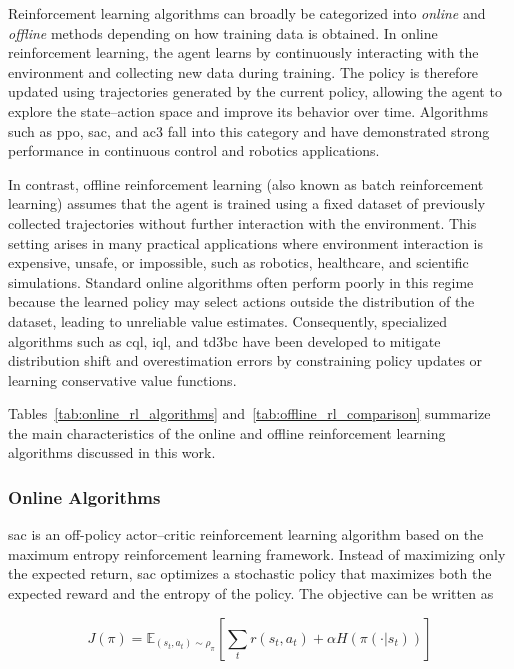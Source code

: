 
Reinforcement learning algorithms can broadly be categorized into \textit{online} and \textit{offline} methods depending on how training data is obtained.
In online reinforcement learning, the agent learns by continuously interacting with the environment and collecting new data during training.
The policy is therefore updated using trajectories generated by the current policy, allowing the agent to explore the state–action space and improve its behavior over time.
Algorithms such as \gls{ppo}, \gls{sac}, and \gls{ac3} fall into this category and have demonstrated strong performance in continuous control and robotics applications.

In contrast, offline reinforcement learning (also known as batch reinforcement learning) assumes that the agent is trained using a fixed dataset of previously collected trajectories without further interaction with the environment.
This setting arises in many practical applications where environment interaction is expensive, unsafe, or impossible, such as robotics, healthcare, and scientific simulations.
Standard online algorithms often perform poorly in this regime because the learned policy may select actions outside the distribution of the dataset, leading to unreliable value estimates.
Consequently, specialized algorithms such as \gls{cql}, \gls{iql}, and \gls{td3bc} have been developed to mitigate distribution shift and overestimation errors by constraining policy updates or learning conservative value functions.

Tables~\ref{tab:online_rl_algorithms} and~\ref{tab:offline_rl_comparison} summarize the main characteristics of the online and offline reinforcement learning algorithms discussed in this work.

\subsubsection{Online Algorithms}

\gls{sac} is an off-policy actor–critic reinforcement learning algorithm based on the maximum entropy reinforcement learning framework.
Instead of maximizing only the expected return, \gls{sac} optimizes a stochastic policy that maximizes both the expected reward and the entropy of the policy.
The objective can be written as

\begin{equation} \label{eq:sac_objective}
J(\pi) = \mathbb{E}_{(s_t,a_t)\sim\rho_\pi}
\left[
\sum_t r(s_t,a_t) + \alpha H(\pi(\cdot|s_t))
\right]
\end{equation}

